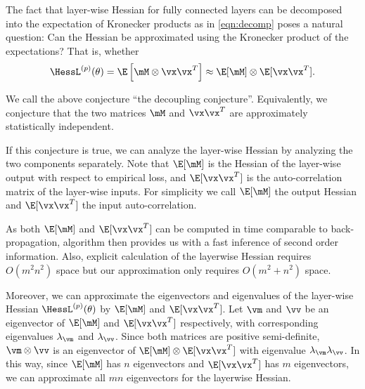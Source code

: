 \label{sec:hessian}


The fact that layer-wise Hessian for fully connected layers can be decomposed into the expectation of Kronecker products as in \cref{eqn:decomp} poses a natural question: Can the Hessian be approximated using the Kronecker product of the expectations? That is, whether 
\begin{equation}
    \HessL^{(p)}(\theta) = \E\left[\mM\otimes \vx\vx^T\right] \approx \E[\mM] \otimes \E[\vx\vx^T]. 
\end{equation}

We call the above conjecture ``the decoupling conjecture''. Equivalently, we conjecture that the two matrices $\mM$ and $\vx\vx^T$ are approximately statistically independent.


If this conjecture is true, we can analyze the layer-wise Hessian by analyzing the two components separately. Note that $\E[\mM]$ is the Hessian of the layer-wise output with respect to empirical loss, and $\E[\vx\vx^T]$ is the auto-correlation matrix of the layer-wise inputs. For simplicity we call $\E[\mM]$ the output Hessian and $\E[\vx\vx^T]$ the input auto-correlation.

As both $\E[\mM]$ and $\E[\vx\vx^T]$ can be computed in time comparable to back-propagation, algorithm then provides us with a fast inference of second order information. Also, explicit calculation of the layerwise Hessian requires $O(m^2n^2)$ space but our approximation only requires $O(m^2+n^2)$ space.

Moreover, we can approximate the eigenvectors and eigenvalues of the layer-wise Hessian $\HessL^{(p)}(\theta)$ by $\E[\mM]$ and $\E[\vx\vx^T]$. Let $\vm$ and $\vv$ be an eigenvector of $\E[\mM]$ and $\E[\vx\vx^T]$ respectively, with corresponding eigenvalues $\lambda_\vm$ and $\lambda_\vv$. Since both matrices are positive semi-definite, $\vm \otimes \vv$ is an eigenvector of $\E[\mM] \otimes \E[\vx\vx^T]$ with eigenvalue $\lambda_\vm\lambda_\vv$. In this way, since $\E[\mM]$ has $n$ eigenvectors and $\E[\vx\vx^T]$ has $m$ eigenvectors, we can approximate all $mn$ eigenvectors for the layerwise Hessian.


